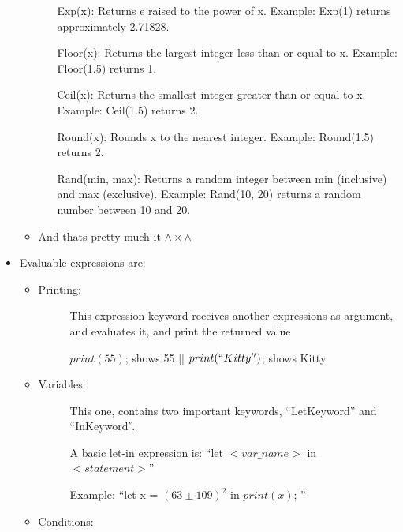 \begin{itemize}
\begin{itemize}
\begin{itemize}
                        \item[Exp{(x)}:] Returns e raised to the power of x. Example: Exp{(1)} returns approximately 2.71828.
                        \item[Floor{(x)}:] Returns the largest integer less than or equal to x. Example: Floor{(1.5)} returns 1.
                        \item[Ceil{(x)}:] Returns the smallest integer greater than or equal to x. Example: Ceil{(1.5)} returns 2.
                        \item[Round{(x)}:] Rounds x to the nearest integer. Example: Round{(1.5)} returns 2.
                        \item[Rand{(min, max)}:] Returns a random integer between min (inclusive) and max (exclusive). Example: Rand{(10, 20)} returns a random number between 10 and 20.
                    \end{itemize}
                \item And thats pretty much it $\land\times \land$ 
            \end{itemize}
        \item Evaluable expressions are:
            \begin{itemize}
                \item Printing:
                    \begin{description}
                    \item[] This expression keyword receives another expressions as argument, and evaluates it, and print the returned value
                    \item[] $print(55)$; shows 55 || $print(``Kitty'')$; shows Kitty
                    \end{description}
                \item Variables:
                    \begin{description}
                        \item[] This one, contains two important keywords, ``LetKeyword'' and ``InKeyword''.
                        \item[] A basic let-in expression is: ``let $<var\_name>$ in $<statement>$''
                        \item[] Example: ``let x = ${(63 \pm 109)}^2$ in $print{(x)}$; ''
                    \end{description}
                \item Conditions:
                    \begin{description}

\end{description}
\end{itemize}
\end{itemize}
